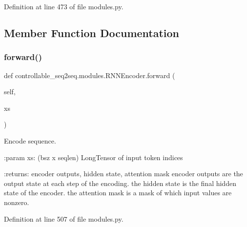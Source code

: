 Definition at line 473 of file modules.\+py.



\subsection{Member Function Documentation}
\mbox{\label{classcontrollable__seq2seq_1_1modules_1_1RNNEncoder_a4f74c2dfb1db01950eea3907de66ab5d}} 
\subsubsection{\texorpdfstring{forward()}{forward()}}
{\footnotesize\ttfamily def controllable\+\_\+seq2seq.\+modules.\+R\+N\+N\+Encoder.\+forward (\begin{DoxyParamCaption}\item[{}]{self,  }\item[{}]{xs }\end{DoxyParamCaption})}

\begin{DoxyVerb}Encode sequence.

:param xs: (bsz x seqlen) LongTensor of input token indices

:returns: encoder outputs, hidden state, attention mask
    encoder outputs are the output state at each step of the encoding.
    the hidden state is the final hidden state of the encoder.
    the attention mask is a mask of which input values are nonzero.
\end{DoxyVerb}
 

Definition at line 507 of file modules.\+py.



